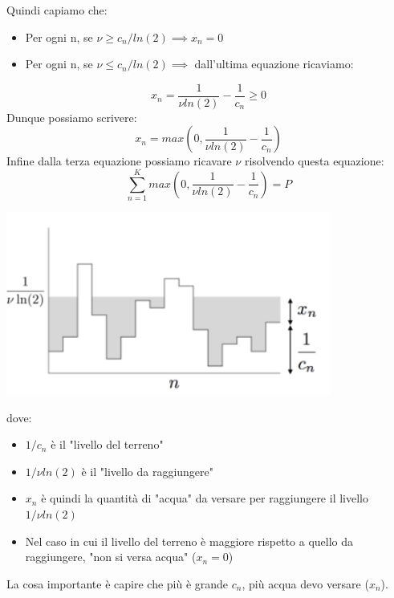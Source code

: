 Quindi capiamo che:
\begin{itemize}
    \item Per ogni n, se $\nu \geq c_n / ln(2) \implies x_n = 0$
    \item Per ogni n, se $\nu \leq c_n / ln(2) \implies $ dall'ultima equazione ricaviamo:
\end{itemize}
\begin{equation*}
    x_n = \frac{1}{\nu ln(2)} - \frac{1}{c_n} \geq 0
\end{equation*}
Dunque possiamo scrivere:
\begin{equation*}
    x_n = max\left(0, \frac{1}{\nu ln(2)} - \frac{1}{c_n}\right)
\end{equation*}
Infine dalla terza equazione possiamo ricavare $\nu$ risolvendo questa equazione:
\begin{equation*}
    \sum_{n=1}^K max\left(0, \frac{1}{\nu ln(2)} - \frac{1}{c_n}\right) = P
\end{equation*}
\begin{center}
    \includegraphics[width=0.8\textwidth]{Images/WaterFilling.png}
\end{center}
dove:
\begin{itemize}
    \item $1/c_n$ è il "livello del terreno"
    \item $1/\nu ln(2)$ è il "livello da raggiungere"
    \item $x_n$ è quindi la quantità di "acqua" da versare per raggiungere il livello $1/\nu ln(2)$
    \item Nel caso in cui il livello del terreno è maggiore rispetto a quello da raggiungere, "non si versa acqua" ($x_n = 0$)
\end{itemize}
\vspace{10pt}
\begin{center}
    La cosa importante è capire che più è grande $c_n$, più acqua devo versare ($x_n$).
\end{center}


